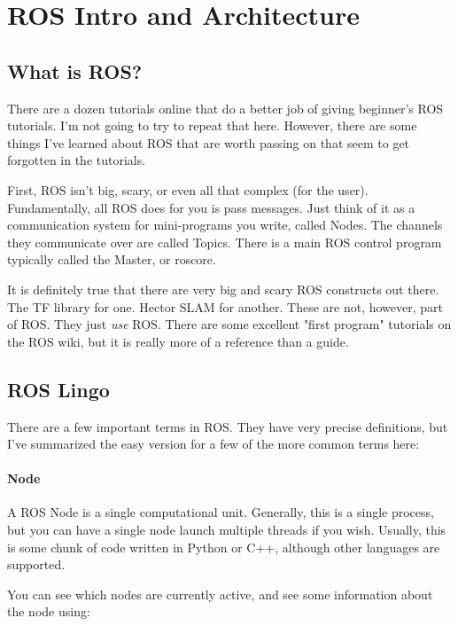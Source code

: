 
\chapter{ROS Intro and Architecture}
\label{chap:rosarchitecture}

\section{What is ROS?}

There are a dozen tutorials online that do a better job of giving beginner's ROS tutorials. I'm not going to try to repeat that here. However, there are some things I've learned about ROS that are worth passing on that seem to get forgotten in the tutorials.

First, ROS isn't big, scary, or even all that complex (for the user). Fundamentally, all ROS does for you is pass messages. Just think of it as a communication system for mini-programs you write, called Nodes. The channels they communicate over are called Topics. There is a main ROS control program typically called the Master, or roscore.

It is definitely true that there are very big and scary ROS constructs out there. The TF library for one. Hector SLAM for another. These are not, however, part of ROS. They just \textit{use} ROS. There are some excellent "first program" tutorials on the ROS wiki, but it is really more of a reference than a guide.

\section{ROS Lingo}

There are a few important terms in ROS. They have very precise definitions, but I've summarized the easy version for a few of the more common terms here:

\subsubsection{Node}

A ROS Node is a single computational unit. Generally, this is a single process, but you can have a single node launch multiple threads if you wish. Usually, this is some chunk of code written in Python or C++, although other languages are supported.

You can see which nodes are currently active, and see some information about the node using:

